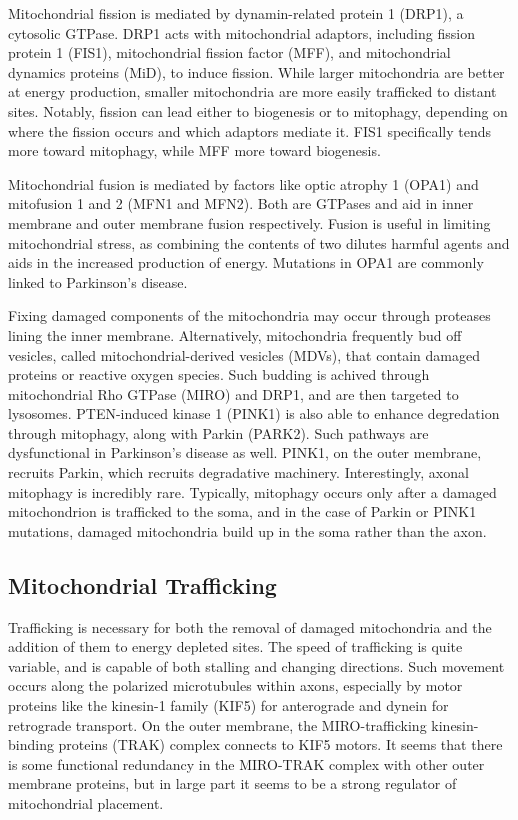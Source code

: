 Mitochondrial fission is mediated by dynamin-related protein 1 (DRP1), a cytosolic GTPase. DRP1 acts with mitochondrial adaptors, including fission protein 1 (FIS1), mitochondrial fission factor (MFF), and mitochondrial dynamics proteins (MiD), to induce fission. While larger mitochondria are better at energy production, smaller mitochondria are more easily trafficked to distant sites. Notably, fission can lead either to biogenesis or to mitophagy, depending on where the fission occurs and which adaptors mediate it. FIS1 specifically tends more toward mitophagy, while MFF more toward biogenesis.\newline

Mitochondrial fusion is mediated by factors like optic atrophy 1 (OPA1) and mitofusion 1 and 2 (MFN1 and MFN2). Both are GTPases and aid in inner membrane and outer membrane fusion respectively. Fusion is useful in limiting mitochondrial stress, as combining the contents of two dilutes harmful agents and aids in the increased production of energy. Mutations in OPA1 are commonly linked to Parkinson's disease.\newline

Fixing damaged components of the mitochondria may occur through proteases lining the inner membrane. Alternatively, mitochondria frequently bud off vesicles, called mitochondrial-derived vesicles (MDVs), that contain damaged proteins or reactive oxygen species. Such budding is achived through mitochondrial Rho GTPase (MIRO) and DRP1, and are then targeted to lysosomes. PTEN-induced kinase 1 (PINK1) is also able to enhance degredation through mitophagy, along with Parkin (PARK2). Such pathways are dysfunctional in Parkinson's disease as well. PINK1, on the outer membrane, recruits Parkin, which recruits degradative machinery. Interestingly, axonal mitophagy is incredibly rare. Typically, mitophagy occurs only after a damaged mitochondrion is trafficked to the soma, and in the case of Parkin or PINK1 mutations, damaged mitochondria build up in the soma rather than the axon. 

\subsection{Mitochondrial Trafficking}

Trafficking is necessary for both the removal of damaged mitochondria and the addition of them to energy depleted sites. The speed of trafficking is quite variable, and is capable of both stalling and changing directions. Such movement occurs along the polarized microtubules within axons, especially by motor proteins like the kinesin-1 family (KIF5) for anterograde and dynein for retrograde transport. On the outer membrane, the MIRO-trafficking kinesin-binding proteins (TRAK) complex connects to KIF5 motors. It seems that there is some functional redundancy in the MIRO-TRAK complex with other outer membrane proteins, but in large part it seems to be a strong regulator of mitochondrial placement.\newline

